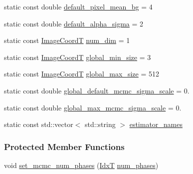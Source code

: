 \begin{DoxyCompactItemize}
static const double \hyperlink{classmappel_1_1PointEmitterModel_abe82d75be8586234657a61e2f137a6c8}{default\+\_\+pixel\+\_\+mean\+\_\+bg} = 4
\item 
static const double \hyperlink{classmappel_1_1PointEmitterModel_a0d9f2c5438940f329e75708987e8b343}{default\+\_\+alpha\+\_\+sigma} = 2
\item 
static const \hyperlink{classmappel_1_1ImageFormat1DBase_a82ab3168eb1a87eaeb3e7c919188e9fc}{Image\+CoordT} \hyperlink{classmappel_1_1ImageFormat1DBase_af81159de9010c3618d2f69349c1f2368}{num\+\_\+dim} = 1
\item 
static const \hyperlink{classmappel_1_1ImageFormat1DBase_a82ab3168eb1a87eaeb3e7c919188e9fc}{Image\+CoordT} \hyperlink{classmappel_1_1ImageFormat1DBase_a27c75df8b3d83856d7c2c42ee987af89}{global\+\_\+min\+\_\+size} = 3
\item 
static const \hyperlink{classmappel_1_1ImageFormat1DBase_a82ab3168eb1a87eaeb3e7c919188e9fc}{Image\+CoordT} \hyperlink{classmappel_1_1ImageFormat1DBase_a5aafad20e635eae6f3609af56abad3ad}{global\+\_\+max\+\_\+size} = 512
\item 
static const double \hyperlink{classmappel_1_1MCMCAdaptorBase_a44cebca0e27135c854fa8430d2d89929}{global\+\_\+default\+\_\+mcmc\+\_\+sigma\+\_\+scale} = 0.
\item 
static const double \hyperlink{classmappel_1_1MCMCAdaptorBase_aebc93881ca351e67de867238a62579eb}{global\+\_\+max\+\_\+mcmc\+\_\+sigma\+\_\+scale} = 0.
\item 
static const std\+::vector$<$ std\+::string $>$ \hyperlink{classmappel_1_1PoissonNoise1DObjective_a985200133fb3e5bfdf8755296cf700eb}{estimator\+\_\+names}
\end{DoxyCompactItemize}
\subsubsection*{Protected Member Functions}
\begin{DoxyCompactItemize}
\item 
void \hyperlink{classmappel_1_1MCMCAdaptorBase_ad6c75e327e8732abc2654492f372563a}{set\+\_\+mcmc\+\_\+num\+\_\+phases} (\hyperlink{namespacemappel_ab17ec0f30b61ece292439d7ece81d3a8}{IdxT} \hyperlink{classmappel_1_1MCMCAdaptorBase_a44b90a984ace712584074dc17831fe25}{num\+\_\+phases})
\end{DoxyCompactItemize}
